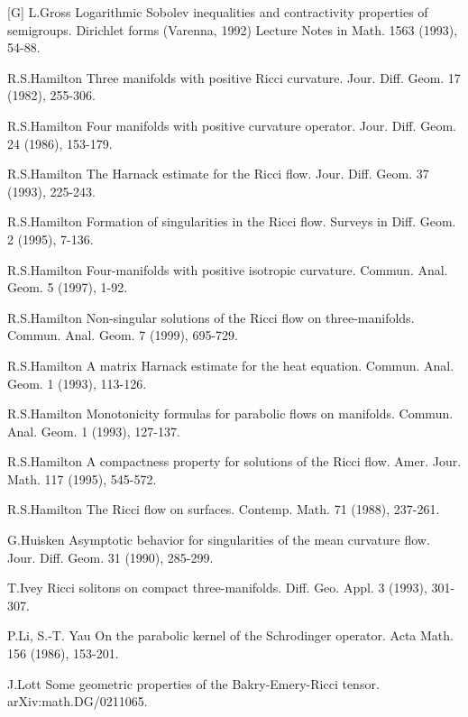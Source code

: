 \documentclass[12pt]{article}
\theoremstyle{plain}
{\swapnumbers
\newtheorem{thm}{Theorem}[section]
\newtheorem{cor}[thm]{Corollary}
\newtheorem{lem}[thm]{Lemma}
\newtheorem{prop}[thm]{Proposition}
}
\theoremstyle{definition}
{\swapnumbers
\newtheorem{defn}[thm]{Definition}
\newtheorem{nota}[thm]{Notation}
\newtheorem{parag}[thm]{}
\newtheorem*{parstr}{\addtocounter{thm}{1}\thesection.\arabic{thm}*}
\newtheorem*{intropar}{\addtocounter{thm}{1}\arabic{thm}}
}
\theoremstyle{remark} {\swapnumbers
\newtheorem{rem}[thm]{Remark}
\newtheorem{exam}[thm]{Example}
\newtheorem{lemma}[thm]{Lemma}
\newtheorem{claim}[thm]{Claim}
}
\numberwithin{equation}{section}
\begin{document}
               [G] L.Gross Logarithmic Sobolev inequalities and
               contractivity properties of semigroups. Dirichlet
               forms (Varenna, 1992) Lecture Notes in Math. 1563
               (1993), 54-88. \par
               [H 1] R.S.Hamilton Three manifolds with positive
               Ricci curvature. Jour. Diff. Geom. 17 (1982),
               255-306. \par
               [H 2] R.S.Hamilton Four manifolds with positive
               curvature operator. Jour. Diff. Geom. 24 (1986),
               153-179. \par
               [H 3] R.S.Hamilton The Harnack estimate for the
               Ricci flow. Jour. Diff. Geom. 37 (1993), 225-243.
               \par [H 4] R.S.Hamilton Formation of singularities
               in the Ricci flow. Surveys in Diff. Geom. 2 (1995),
               7-136. \par
               [H 5] R.S.Hamilton Four-manifolds with positive
               isotropic curvature. Commun. Anal. Geom. 5 (1997),
               1-92. \par
               [H 6] R.S.Hamilton Non-singular solutions of the
               Ricci flow on three-manifolds. Commun. Anal. Geom.
               7 (1999), 695-729. \par
               [H 7] R.S.Hamilton A matrix Harnack estimate for
               the heat equation. Commun. Anal. Geom. 1 (1993),
               113-126. \par
               [H 8] R.S.Hamilton Monotonicity formulas for
               parabolic flows on manifolds. Commun. Anal. Geom. 1
               (1993), 127-137. \par
               [H 9] R.S.Hamilton A compactness property for
               solutions of the Ricci flow. Amer. Jour. Math. 117
               (1995), 545-572. \par
               [H 10] R.S.Hamilton The Ricci flow on surfaces.
               Contemp. Math. 71 (1988), 237-261.
               \par [Hu] G.Huisken Asymptotic behavior for
               singularities of the mean curvature flow. Jour.
               Diff. Geom. 31 (1990), 285-299.
               \par [I] T.Ivey Ricci solitons on compact
               three-manifolds. Diff. Geo. Appl. 3 (1993),
               301-307.
               \par [L-Y] P.Li, S.-T. Yau On the parabolic kernel
               of the Schrodinger operator. Acta Math. 156 (1986),
               153-201. \par
               [Lott] J.Lott Some geometric properties of the
               Bakry-Emery-Ricci tensor. arXiv:math.DG/0211065.
\end{document}
